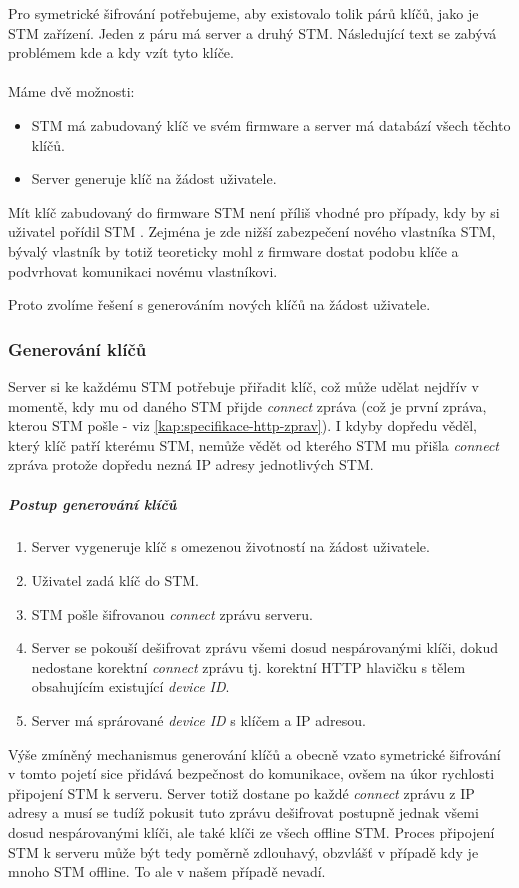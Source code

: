Pro symetrické šifrování potřebujeme, aby existovalo tolik párů klíčů, jako je STM zařízení.
Jeden z páru má server a druhý STM.
Následující text se zabývá problémem kde a kdy vzít tyto klíče.
\\ \\ 
Máme dvě možnosti:
\begin{itemize}
    \item STM má zabudovaný klíč ve svém firmware a server má databází všech těchto klíčů.
    \item Server generuje klíč na žádost uživatele.
\end{itemize}

Mít klíč zabudovaný do firmware STM není příliš vhodné pro případy, kdy by si uživatel pořídil STM
.
Zejména je zde nižší zabezpečení nového vlastníka STM, bývalý vlastník by totiž teoreticky
mohl z firmware dostat podobu klíče a podvrhovat komunikaci novému vlastníkovi.

Proto zvolíme řešení s generováním nových klíčů na žádost uživatele.

\subsubsection{Generování klíčů}

Server si ke každému STM potřebuje přiřadit klíč, což může udělat nejdřív v momentě, kdy
mu od daného STM přijde \emph{connect} zpráva (což je první zpráva, kterou STM pošle - viz
\ref{kap:specifikace-http-zprav}).
I kdyby dopředu věděl, který klíč patří kterému STM, nemůže vědět od kterého STM mu přišla
\emph{connect} zpráva protože dopředu nezná IP adresy jednotlivých STM.

\subparagraph{Postup generování klíčů}
\begin{enumerate}
    \item Server vygeneruje klíč s omezenou životností na žádost uživatele.
    \item Uživatel zadá klíč do STM.
    \item STM pošle šifrovanou \emph{connect} zprávu serveru.
    \item Server se pokouší dešifrovat zprávu všemi dosud nespárovanými klíči, dokud nedostane korektní
        \emph{connect} zprávu tj. korektní HTTP hlavičku s tělem obsahujícím existující \emph{device ID}.
    \item Server má sprárované \emph{device ID} s klíčem a IP adresou.
\end{enumerate}

Výše zmíněný mechanismus generování klíčů a obecně vzato symetrické šifrování v tomto pojetí sice
přidává bezpečnost do komunikace, ovšem na úkor rychlosti připojení STM k serveru.
Server totiž dostane po každé \emph{connect} zprávu z  IP adresy a musí se tudíž
pokusit tuto zprávu dešifrovat postupně jednak všemi dosud nespárovanými klíči, ale také klíči
ze všech offline STM.
Proces připojení STM k serveru může být tedy poměrně zdlouhavý, obzvlášť v případě kdy je mnoho
STM offline.
To ale v našem případě nevadí.
